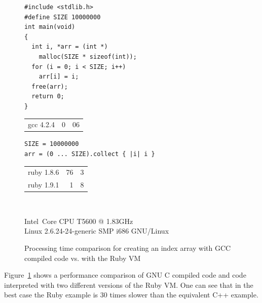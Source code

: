\documentclass[12pt,a4paper,oneside,openright]{book}
\newcommand{\fig}[1]{Figure~\ref{fig:#1}}
\begin{document}
\begin{CJK}{UTF8}{}
\begin{figure}[htbp]
  \begin{center}
    \lstset{language=C,frame=single,numbers=none}
    \begin{minipage}[c]{.45\textwidth}
      \begin{center}
        \begin{lstlisting}
#include <stdlib.h>
#define SIZE 10000000
int main(void)
{
  int i, *arr = (int *)
    malloc(SIZE * sizeof(int));
  for (i = 0; i < SIZE; i++)
    arr[i] = i;
  free(arr);
  return 0;
}
        \end{lstlisting}
        \begin{bf}
          \begin{tabular}{lr@{.}l@{s}}
            gcc 4.2.4 & 0 & 06
          \end{tabular}
        \end{bf}
      \end{center}
    \end{minipage}\hspace{1ex}
    \lstset{language=Ruby,frame=single,numbers=none}
    \begin{minipage}[c]{.5\textwidth}
      \begin{center}
        \begin{lstlisting}
SIZE = 10000000
arr = (0 ... SIZE).collect { |i| i }
        \end{lstlisting}
        \begin{bf}
          \begin{tabular}{lr@{.}l@{s}}
            ruby 1.8.6 & 76 & 3\\
            ruby 1.9.1 &  1 & 8
          \end{tabular}
        \end{bf}
      \end{center}
    \end{minipage}\medskip\\
    \begin{small}
      Intel\textregistered\ Core \acs{CPU} T5600 @ 1.83GHz\\
      Linux 2.6.24-24-generic SMP i686 \acs{GNU}/Linux
    \end{small}
  \end{center}
  \caption{Processing time comparison for creating an index array with GCC compiled code vs. with the Ruby \acs{VM}\label{fig:arraybench}}
\end{figure}
\fig{arraybench} shows a performance comparison of \acs{GNU} C compiled code and code interpreted with two different versions of the Ruby \ac{VM}. One can see that in the best case the Ruby example is 30 times slower than the equivalent C++ example.


\end{CJK}
\end{document}
